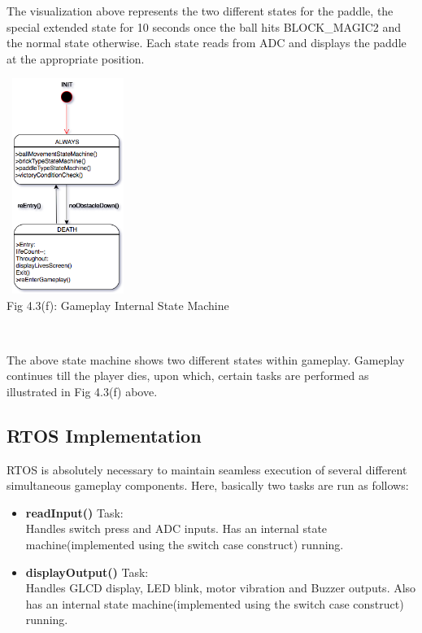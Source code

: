 \documentclass[a4paper,12pt,oneside]{book}
\begin{document}
\qquad The visualization above represents the two different states for the paddle, the special extended state for 10 seconds once the ball hits BLOCK\_MAGIC2 and the normal state otherwise. Each state reads from ADC and displays the paddle at the appropriate position.
\begin{center}
\includegraphics[width=4cm, height=7cm]{BreakoutImages/gameplayStateMachine}\\
\caption{Fig 4.3(f): Gameplay Internal State Machine} \\
\end{center}
\qquad The above state machine shows two different states within gameplay. Gameplay continues till the player dies, upon which, certain tasks are performed as illustrated in Fig 4.3(f) above.
\subsection{RTOS Implementation}
\qquad RTOS is absolutely necessary to maintain seamless execution of several different simultaneous gameplay components. Here, basically two tasks are run as follows:
\begin{itemize}
  \item \textbf{{\small readInput()}} Task: \\ \qquad \qquad Handles switch press and ADC inputs. Has an internal state machine(implemented using the switch case construct) running.
  \item \textbf{{\small displayOutput()}} Task: \\ \qquad \qquad Handles GLCD display, LED blink, motor vibration and Buzzer outputs. Also has an internal state machine(implemented using the switch case construct) running.
\end{itemize}
\end{document}
